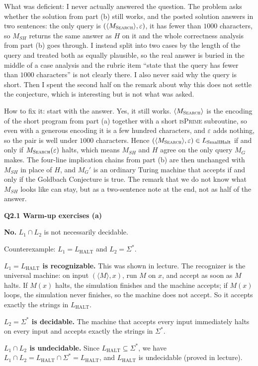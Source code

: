 \documentclass[11pt]{article}
\newcommand{\inner}[1]{\langle #1 \rangle}
\newcommand{\algo}[1]{\textsc{#1}}
\newcommand{\Lh}{L_{\text{HALT}}}
\newcommand{\Lsmh}{L_{\text{SmallHalt}}}
\newcommand{\Ms}{M_{\textsc{Search}}}
\newcommand{\qpage}[1]{\clearpage\noindent\textbf{\large #1}\par\medskip}
\begin{document}
What was deficient: I never actually answered the question.
The problem asks whether the solution from part (b) still works, and the posted solution answers in two sentences: the only query is $(\inner{\Ms}, \varepsilon)$, it has fewer than $1000$ characters, so $M_{SH}$ returns the same answer as $H$ on it and the whole correctness analysis from part (b) goes through.
I instead split into two cases by the length of the query and treated both as equally plausible, so the real answer is buried in the middle of a case analysis and the rubric item ``state that the query has fewer than $1000$ characters'' is not clearly there.
I also never said why the query is short.
Then I spent the second half on the remark about why this does not settle the conjecture, which is interesting but is not what was asked.

How to fix it: start with the answer.
Yes, it still works.
$\inner{\Ms}$ is the encoding of the short program from part (a) together with a short \algo{isPrime} subroutine, so even with a generous encoding it is a few hundred characters, and $\varepsilon$ adds nothing, so the pair is well under $1000$ characters.
Hence $(\inner{\Ms}, \varepsilon) \in \Lsmh$ if and only if $\Ms(\varepsilon)$ halts, which means $M_{SH}$ and $H$ agree on the only query $M_G$ makes.
The four-line implication chains from part (b) are then unchanged with $M_{SH}$ in place of $H$, and $M_G'$ is an ordinary Turing machine that accepts if and only if the Goldbach Conjecture is true.
The remark that we do not know what $M_{SH}$ looks like can stay, but as a two-sentence note at the end, not as half of the answer.

\qpage{Q2.1 Warm-up exercises (a)}

\textbf{No.} $L_1 \cap L_2$ is not necessarily decidable.

Counterexample: $L_1 = \Lh$ and $L_2 = \Sigma^*$.

\textbf{$L_1 = \Lh$ is recognizable.}
This was shown in lecture.
The recognizer is the universal machine: on input $(\inner{M}, x)$, run $M$ on $x$, and accept as soon as $M$ halts.
If $M(x)$ halts, the simulation finishes and the machine accepts; if $M(x)$ loops, the simulation never finishes, so the machine does not accept.
So it accepts exactly the strings in $\Lh$.

\textbf{$L_2 = \Sigma^*$ is decidable.}
The machine that accepts every input immediately halts on every input and accepts exactly the strings in $\Sigma^*$.

\textbf{$L_1 \cap L_2$ is undecidable.}
Since $\Lh \subseteq \Sigma^*$, we have $L_1 \cap L_2 = \Lh \cap \Sigma^* = \Lh$, and $\Lh$ is undecidable (proved in lecture).
\end{document}
